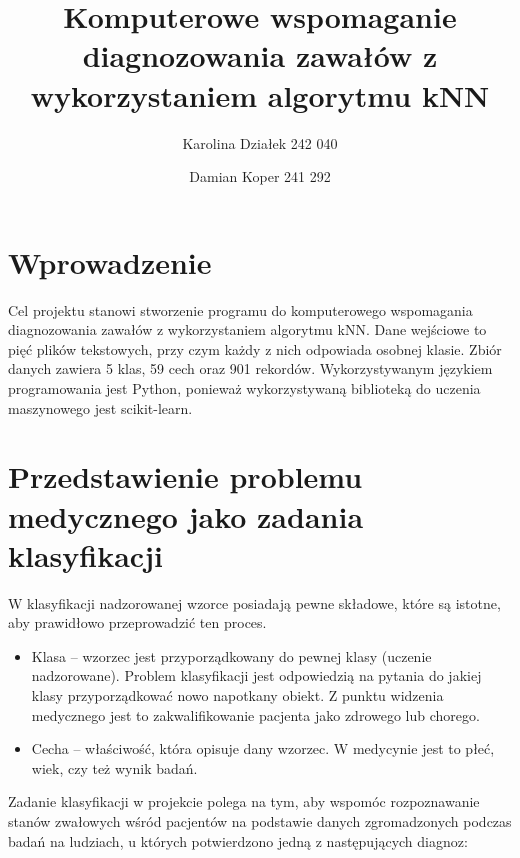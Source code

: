 \documentclass[runningheads]{llncs}
\begin{document}
%
\title{Komputerowe wspomaganie diagnozowania zawałów z wykorzystaniem algorytmu kNN}
%
%
\author{Karolina Działek 242 040 \and
Damian Koper 241 292}

\maketitle
%
%
\section{Wprowadzenie}
Cel projektu stanowi stworzenie programu do komputerowego wspomagania diagnozowania zawałów z wykorzystaniem algorytmu kNN. Dane wejściowe to pięć plików tekstowych, przy czym każdy z nich odpowiada osobnej klasie. Zbiór danych zawiera 5 klas, 59 cech oraz 901 rekordów. Wykorzystywanym językiem programowania jest Python, ponieważ wykorzystywaną biblioteką do uczenia maszynowego jest scikit-learn.

\section{Przedstawienie problemu medycznego jako zadania klasyfikacji}
W klasyfikacji nadzorowanej wzorce posiadają pewne składowe, które są istotne, aby prawidłowo przeprowadzić ten proces.

\begin{itemize}
\item Klasa – wzorzec jest przyporządkowany do pewnej klasy (uczenie nadzorowane). Problem klasyfikacji jest odpowiedzią na pytania do jakiej klasy przyporządkować nowo napotkany obiekt. Z punktu widzenia medycznego jest to zakwalifikowanie pacjenta jako zdrowego lub chorego.

\item Cecha – właściwość, która opisuje dany wzorzec. W medycynie jest to płeć, wiek, czy też wynik badań.
\end{itemize}

Zadanie klasyfikacji w projekcie polega na tym, aby wspomóc rozpoznawanie stanów zwałowych wśród pacjentów na podstawie danych zgromadzonych podczas badań na ludziach, u których potwierdzono jedną z następujących diagnoz:
\end{document}
